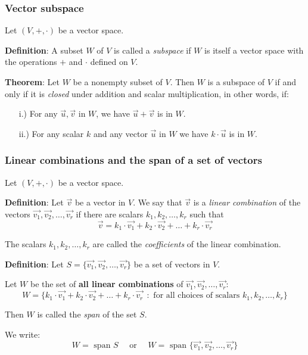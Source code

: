 \begin{frame}[fragile]
\frametitle{Vector subspace}

Let $(V, +, \cdot)$ be a vector space.



\textbf{Definition}:  A subset $W$ of $V$ is called a {\em subspace} if $W$ is itself a vector space with the operations $+$ and $\cdot$ defined on $V$.



\textbf{Theorem}: Let $W$ be a nonempty subset of $V$. Then $W$ is a subspace of $V$ if and only if it is {\em closed} under addition and scalar multiplication, in other words, if:

\begin{itemize}
\item[i.)] For any $\vec{u}, \vec{v}$ in $W$, we have $\vec{u} + \vec{v}$ is in $W$.

\item[ii.)] For any scalar $k$ and any vector $\vec{u}$ in $W$ we have $k \cdot \vec{u}$ is in $W$.
\end{itemize}
 

\end{frame}


\begin{frame}[fragile]
\frametitle{Linear combinations and the span of a set of vectors}

Let $(V, +, \cdot)$ be a vector space.



\textbf{Definition}: Let $\vec{v}$ be a vector in $V$. We say that $\vec{v}$ is a {\em linear combination} of the vectors $\vec{v_1}, \vec{v_2}, \ldots, \vec{v_r}$ if there are scalars $k_1, k_2, \ldots, k_r$ such that
$$\vec{v} = k_1 \cdot \vec{v_1} + k_2 \cdot \vec{v_2} + \ldots + k_r \cdot \vec{v_r}$$

The scalars $k_1, k_2, \ldots, k_r$ are called the {\em coefficients} of the linear combination.





\textbf{Definition}: Let $S = \{ \vec{v_1}, \vec{v_2}, \ldots, \vec{v_r} \}$ be a set of vectors in $V$.

Let $W$ be the set of \textbf{all linear combinations} of $\vec{v_1}, \vec{v_2}, \ldots, \vec{v_r}$:
$$W = \{  k_1 \cdot \vec{v_1} + k_2 \cdot \vec{v_2} + \ldots + k_r \cdot \vec{v_r} \ \  \colon  \text{ for all choices of scalars } k_1, k_2, \ldots, k_r \}$$

Then $W$ is called the {\em span} of the set $S$.

We write:
$$W = \text{ span } S  \quad \text{ or } \quad W = \text{ span }   \{ \vec{v_1}, \vec{v_2}, \ldots, \vec{v_r} \}$$

\end{frame}



